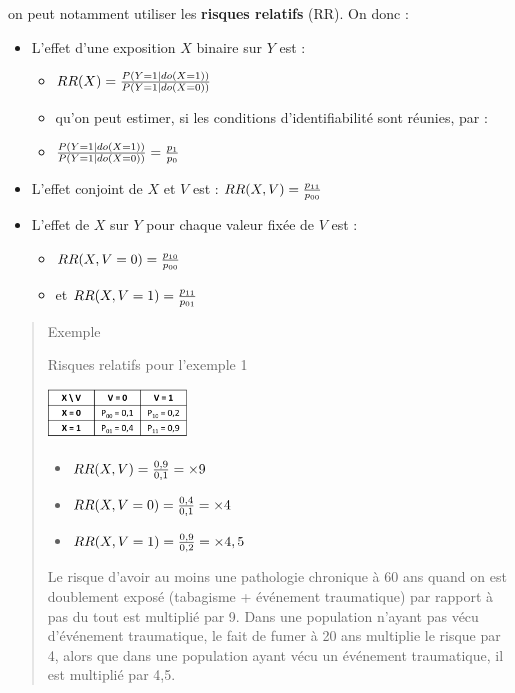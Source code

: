 \documentclass[
]{book}
\providecommand{\tightlist}{%
  \setlength{\itemsep}{0pt}\setlength{\parskip}{0pt}}
\begin{document}
on peut notamment utiliser les \textbf{risques relatifs} (RR). On donc :

\begin{itemize}
\tightlist
\item
  L'effet d'une exposition \(X\) binaire sur \(Y\) est :

  \begin{itemize}
  \tightlist
  \item
    \(\small RR(X) = \frac{P(Y = 1| do(X = 1)) }{ P(Y = 1|do(X = 0))}\)
  \item
    qu'on peut estimer, si les conditions d'identifiabilité sont réunies, par :
  \item
    \(\small \frac{P(Y = 1| do(X = 1)) }{ P(Y = 1|do(X = 0))} = \frac{p_1}{p_0}\)
  \end{itemize}
\item
  L'effet conjoint de \(X\) et \(V\) est : \(\small RR(X,V) = \frac{p_{11}}{p_{00}}\)
\item
  L'effet de \(X\) sur \(Y\) pour chaque valeur fixée de \(V\) est :

  \begin{itemize}
  \tightlist
  \item
    \(\small RR(X,V=0) = \frac{p_{10}}{p_{00}}\)
  \item
    et \(\small RR(X,V=1) = \frac{p_{11}}{p_{01}}\)
  \end{itemize}
\end{itemize}

\begin{quote}
Exemple

Risques relatifs pour l'exemple 1

\includegraphics[width=0.3\textwidth,height=\textheight]{img/Image1.png}

\begin{itemize}
\tightlist
\item
  \(\small RR(X,V) = \frac{0,9}{0,1} = \times 9\)
\item
  \(\small RR(X,V=0) = \frac{0,4}{0,1} = \times 4\)
\item
  \(\small RR(X,V=1) = \frac{0,9}{0,2} = \times 4,5\)
\end{itemize}

Le risque d'avoir au moins une pathologie chronique à 60 ans quand on est doublement exposé (tabagisme + événement traumatique) par rapport à pas du tout est multiplié par 9. Dans une population n'ayant pas vécu d'événement traumatique, le fait de fumer à 20 ans multiplie le risque par 4, alors que dans une population ayant vécu un événement traumatique, il est multiplié par 4,5.
\end{quote}
\end{document}
